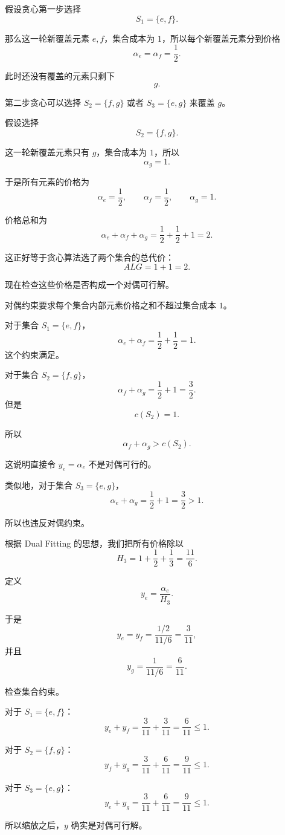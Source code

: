 \documentclass[UTF8,openany,12pt]{ctexbook}
\theoremstyle{remark}
\begin{document}
假设贪心第一步选择
\[
  S_1=\{e,f\}.
\]

那么这一轮新覆盖元素 $e,f$，集合成本为 $1$，所以每个新覆盖元素分到价格
\[
  \alpha_e=\alpha_f=\frac12.
\]

此时还没有覆盖的元素只剩下
\[
  g.
\]

第二步贪心可以选择 $S_2=\{f,g\}$ 或者 $S_3=\{e,g\}$ 来覆盖 $g$。

假设选择
\[
  S_2=\{f,g\}.
\]

这一轮新覆盖元素只有 $g$，集合成本为 $1$，所以
\[
  \alpha_g=1.
\]

于是所有元素的价格为
\[
  \alpha_e=\frac12,\qquad
  \alpha_f=\frac12,\qquad
  \alpha_g=1.
\]

价格总和为
\[
  \alpha_e+\alpha_f+\alpha_g
  =
  \frac12+\frac12+1
  =
  2.
\]

这正好等于贪心算法选了两个集合的总代价：
\[
  ALG=1+1=2.
\]

现在检查这些价格是否构成一个对偶可行解。

对偶约束要求每个集合内部元素价格之和不超过集合成本 $1$。

对于集合 $S_1=\{e,f\}$，
\[
  \alpha_e+\alpha_f
  =
  \frac12+\frac12
  =
  1.
\]
这个约束满足。

对于集合 $S_2=\{f,g\}$，
\[
  \alpha_f+\alpha_g
  =
  \frac12+1
  =
  \frac32.
\]
但是
\[
  c(S_2)=1.
\]

所以
\[
  \alpha_f+\alpha_g > c(S_2).
\]

这说明直接令 $y_e=\alpha_e$ 不是对偶可行的。

类似地，对于集合 $S_3=\{e,g\}$，
\[
  \alpha_e+\alpha_g
  =
  \frac12+1
  =
  \frac32>1.
\]

所以也违反对偶约束。

根据 Dual Fitting 的思想，我们把所有价格除以
\[
  H_3 = 1+\frac12+\frac13 = \frac{11}{6}.
\]

定义
\[
  y_e=\frac{\alpha_e}{H_3}.
\]

于是
\[
  y_e=y_f=\frac{1/2}{11/6}=\frac{3}{11},
\]
并且
\[
  y_g=\frac{1}{11/6}=\frac{6}{11}.
\]

检查集合约束。

对于 $S_1=\{e,f\}$：
\[
  y_e+y_f
  =
  \frac{3}{11}+\frac{3}{11}
  =
  \frac{6}{11}
  \le 1.
\]

对于 $S_2=\{f,g\}$：
\[
  y_f+y_g
  =
  \frac{3}{11}+\frac{6}{11}
  =
  \frac{9}{11}
  \le 1.
\]

对于 $S_3=\{e,g\}$：
\[
  y_e+y_g
  =
  \frac{3}{11}+\frac{6}{11}
  =
  \frac{9}{11}
  \le 1.
\]

所以缩放之后，$y$ 确实是对偶可行解。
\end{document}
